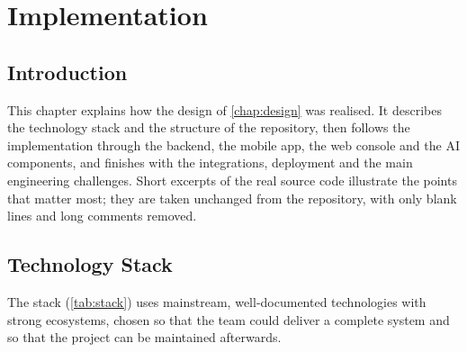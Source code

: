 \chapter{Implementation}\label{chap:implementation}

\section{Introduction}

This chapter explains how the design of \cref{chap:design} was realised. It describes the technology stack and the
structure of the repository, then follows the implementation through the backend, the mobile app, the web console
and the AI components, and finishes with the integrations, deployment and the main engineering challenges. Short
excerpts of the real source code illustrate the points that matter most; they are taken unchanged from the
repository, with only blank lines and long comments removed.

\section{Technology Stack}

The stack (\cref{tab:stack}) uses mainstream, well-documented technologies with strong ecosystems, chosen so that
the team could deliver a complete system and so that the project can be maintained afterwards.

